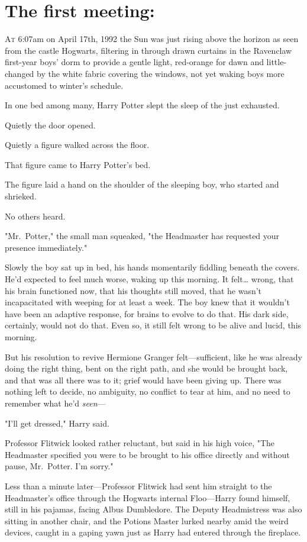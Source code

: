 
\section{The first meeting:}

\lettrine{A}{t} 6:07am on April 17th, 1992 the Sun was just rising above the horizon as seen
from the castle Hogwarts, filtering in through drawn curtains in the Ravenclaw
first-year boys' dorm to provide a gentle light, red-orange for dawn and
little-changed by the white fabric covering the windows, not yet waking boys
more accustomed to winter's schedule.

In one bed among many, Harry Potter slept the sleep of the just exhausted.

Quietly the door opened.

Quietly a figure walked across the floor.

That figure came to Harry Potter's bed.

The figure laid a hand on the shoulder of the sleeping boy, who started and
shrieked.

No others heard.

"Mr.~Potter," the small man squeaked, "the Headmaster has requested your
presence immediately."

Slowly the boy sat up in bed, his hands momentarily fiddling beneath the
covers. He'd expected to feel much worse, waking up this morning. It
felt{\ldots} wrong, that his brain functioned now, that his thoughts still
moved, that he wasn't incapacitated with weeping for at least a week. The boy
knew that it wouldn't have been an adaptive response, for brains to evolve to
do that. His dark side, certainly, would not do that. Even so, it still felt
wrong to be alive and lucid, this morning.

But his resolution to revive Hermione Granger felt---sufficient, like he was
already doing the right thing, bent on the right path, and she would be brought
back, and that was all there was to it; grief would have been giving up. There
was nothing left to decide, no ambiguity, no conflict to tear at him, and no
need to remember what he'd \emph{seen}---

"I'll get dressed," Harry said.

Professor Flitwick looked rather reluctant, but said in his high voice, "The
Headmaster specified you were to be brought to his office directly and without
pause, Mr.~Potter. I'm sorry."

Less than a minute later---Professor Flitwick had sent him straight to the
Headmaster's office through the Hogwarts internal Floo---Harry found himself,
still in his pajamas, facing Albus Dumbledore. The Deputy Headmistress was also
sitting in another chair, and the Potions Master lurked nearby amid the weird
devices, caught in a gaping yawn just as Harry had entered through the
fireplace.

